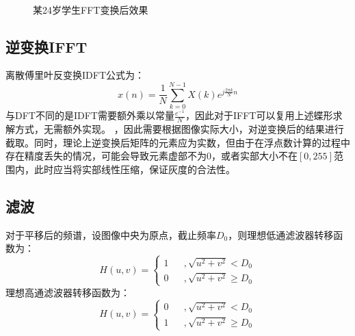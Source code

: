 \documentclass[UTF8]{ctexart}
\begin{document}
		\begin{figure}[htbp]
		\centering
		 \\
		\caption{某24岁学生FFT变换后效果}
		\end{figure}

	\subsection{逆变换IFFT}
		离散傅里叶反变换IDFT公式为：
		\[
			x(n) = \frac{1}{N}\sum_{k=0}^{N-1}X(k)e^{j\frac{2\pi k}{N}n}
		\]
		与DFT不同的是IDFT需要额外乘以常量$\frac{e^{-1}}{N}$，因此对于IFFT可以复用上述蝶形求解方式，无需额外实现。
		，因此需要根据图像实际大小，对逆变换后的结果进行截取。同时，理论上逆变换后矩阵的元素应为实数，但由于在浮点数计算的过程中存在精度丢失的情况，可能会导致元素虚部不为0，或者实部大小不在$[0,255]$范围内，此时应当将实部线性压缩，保证灰度的合法性。

	\subsection{滤波}
		对于平移后的频谱，设图像中央为原点，截止频率$D_0$，则理想低通滤波器转移函数为：
		\[
			H(u,v) = \left\{
			\begin{array}{lcl}
			1 & &, {\sqrt{u^2+v^2} < D_0} \\
			0 & &, {\sqrt{u^2+v^2} \ge D_0}
			\end{array}
			\right.
		\]
		理想高通滤波器转移函数为：
		\[
			H(u,v) = \left\{
			\begin{array}{lcl}
			0 & &, {\sqrt{u^2+v^2} < D_0} \\
			1 & &, {\sqrt{u^2+v^2} \ge D_0}
			\end{array}
			\right.
		\]
\end{document}

